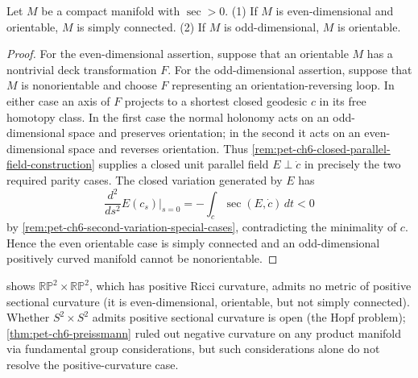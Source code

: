 \begin{theorem}
  \label{thm:pet-ch6-synge-theorem}
  Let $M$ be a compact manifold with $\sec>0$. (1) If $M$ is even-dimensional
  and orientable, $M$ is simply connected. (2) If $M$ is odd-dimensional,
  $M$ is orientable.
\end{theorem}
\begin{proof}
  \sketch
  For the even-dimensional assertion, suppose that an orientable $M$ has a
  nontrivial deck transformation $F$. For the odd-dimensional assertion,
  suppose that $M$ is nonorientable and choose $F$ representing an
  orientation-reversing loop. In either case an axis of $F$ projects to a
  shortest closed geodesic $c$ in its free homotopy class. In the first case
  the normal holonomy acts on an odd-dimensional space and preserves
  orientation; in the second it acts on an even-dimensional space and reverses
  orientation. Thus \cref{rem:pet-ch6-closed-parallel-field-construction}
  supplies a closed unit parallel field $E\perp\dot c$ in precisely the two
  required parity cases. The closed variation generated by $E$ has
  \[
    \frac{d^2}{ds^2}E(c_s)\bigg|_{s=0}
      =-\int_c\sec(E,\dot c)\,dt<0
  \]
  by \cref{rem:pet-ch6-second-variation-special-cases}, contradicting the
  minimality of $c$. Hence the even orientable case is simply connected and an
  odd-dimensional positively curved manifold cannot be nonorientable.
\end{proof}

\begin{remark}
  \label{rem:pet-ch6-hopf-problem}
   shows $\mathbb{RP}^2\times\mathbb{RP}^2$, which has
  positive Ricci curvature, admits no metric of positive sectional curvature
  (it is even-dimensional, orientable, but not simply connected). Whether
  $S^2\times S^2$ admits positive sectional curvature is open (the Hopf
  problem); \cref{thm:pet-ch6-preissmann} ruled out negative curvature on any
  product manifold via fundamental group considerations, but such
  considerations alone do not resolve the positive-curvature case.
\end{remark}

